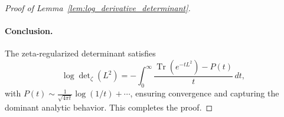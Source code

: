 \begin{proof}[Proof of Lemma~\ref{lem:log_derivative_determinant}]
\paragraph{Conclusion.}
The zeta-regularized determinant satisfies
\[
\log \det\nolimits_\zeta(L^2) = -\int_0^\infty \frac{\operatorname{Tr}(e^{-t L^2}) - P(t)}{t} \, dt,
\]
with \( P(t) \sim \frac{1}{\sqrt{4\pi t}} \log(1/t) + \cdots \), ensuring convergence and capturing the dominant analytic behavior. This completes the proof.
\end{proof}
